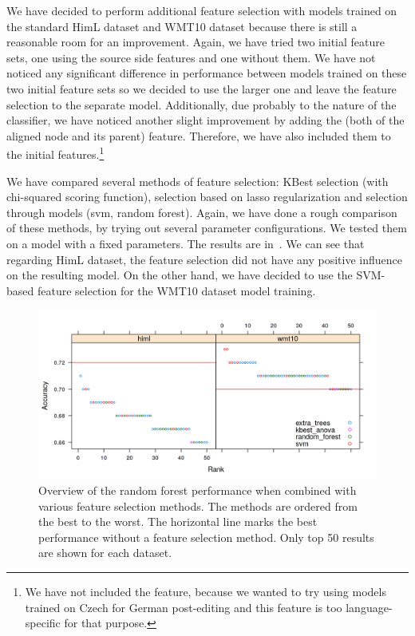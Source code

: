 We have decided to perform additional feature selection with models trained on the standard HimL dataset
and WMT10 dataset because there is still a reasonable room for an improvement. Again, we have tried two initial feature
sets, one using the source side features and one without them. We have not noticed any significant difference in performance
between models trained on these two initial feature sets so we decided to use the larger one and leave
the feature selection to the separate model. Additionally, due probably to the nature of the classifier, we have noticed
another slight improvement by adding the  (both of the aligned node and its parent) feature. Therefore, we have also
included them to the initial features.\footnote{We have not included the  feature, because we wanted to
try using models trained on Czech for German post-editing and this feature is too language-specific for that purpose.}

We have compared several methods of feature selection: KBest selection
(with chi-squared scoring function), selection based on lasso regularization and selection through
models (svm, random forest). Again, we have done a rough comparison of these methods, by trying out
several parameter configurations. We tested them on a model with a fixed parameters. The results
are in~. We can see that regarding HimL dataset, the feature selection did not have
any positive influence on the resulting model. On the other hand, we have decided to use the SVM-based
feature selection for the WMT10 dataset model training.

\begin{figure}
\centering
  \includegraphics[scale=0.7]{cat-sel}
  \caption{
    Overview of the random forest performance when combined with various feature selection methods.
The methods are ordered from the best to the worst. The horizontal line marks the best performance without
a feature selection method. Only top 50 results are shown for each dataset.
}
  \label{cats-sel}
\end{figure}

